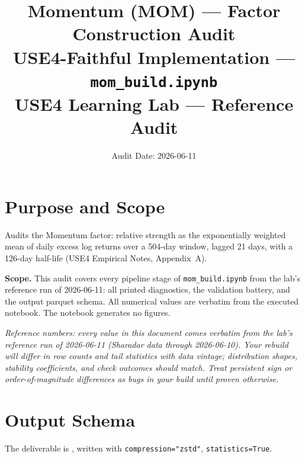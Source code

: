 \documentclass[11pt,a4paper]{article}
\title{\textbf{Momentum (MOM) --- Factor Construction Audit}\\[2pt]
\large USE4-Faithful Implementation --- \texttt{mom\_build.ipynb}\\[4pt]
\normalsize USE4 Learning Lab --- Reference Audit}
\author{Audit Date: 2026-06-11}
\date{}
\newcommand{\NOTE}[1]{\textcolor{note}{\textit{#1}}}
\begin{document}
\maketitle
\tableofcontents
\newpage

\section{Purpose and Scope}

Audits the Momentum factor: relative strength as the exponentially
weighted mean of daily excess log returns over a 504-day window, lagged 21 days,
with a 126-day half-life (USE4 Empirical Notes, Appendix~A).

\smallskip
\textbf{Scope.} This audit covers every pipeline stage of
\texttt{mom\_build.ipynb} from the lab's reference run of 2026-06-11: all printed diagnostics, the
validation battery, and the output parquet schema. All numerical values are
verbatim from the executed notebook. The notebook generates no figures.

\NOTE{Reference numbers: every value in this document comes verbatim from the lab's reference run of 2026-06-11 (Sharadar data through 2026-06-10). Your rebuild will differ in row counts and tail statistics with data vintage; distribution shapes, stability coefficients, and check outcomes should match. Treat persistent sign or order-of-magnitude differences as bugs in your build until proven otherwise.}


\section{Output Schema}

The deliverable is , written with
\texttt{compression="zstd"}, \newline\texttt{statistics=True}.
\end{document}

